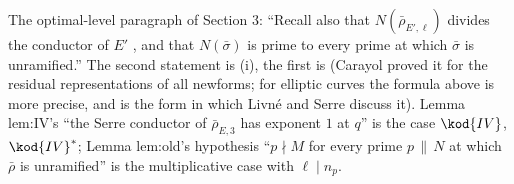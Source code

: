 \begin{paperlink}
The optimal-level paragraph of Section 3: ``Recall also that $N(\bar\rho_{E',\ell})$ divides the conductor of $E'$ \cite{Carayol89}, and that
$N(\bar\sigma)$ is prime to every prime at which $\bar\sigma$ is unramified.'' The second statement is
(i), the first is  (Carayol proved it for the residual representations
of all newforms; for elliptic curves the formula above is more precise, and is the form in which Livn\'e \cite{Livne89} and Serre
\cite[Section 4]{Serre87} discuss it). Lemma lem:IV's ``the Serre conductor of $\bar\rho_{E,3}$ has exponent $1$ at $q$'' is the case $\kod{IV}$, $\kod{IV}^*$; Lemma
lem:old's hypothesis ``$p\nmid M$ for every prime $p\,\|\,N$ at which $\bar\rho$ is unramified'' is the multiplicative case with $\ell\mid n_p$.
\end{paperlink}

